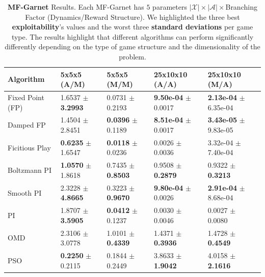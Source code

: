 \documentclass[10pt,twocolumn,letterpaper]{article}
\theoremstyle{definition}
\theoremstyle{remark}
\newcommand{\states}{\mathcal{X}}
\newcommand{\actions}{\mathcal{A}}
\begin{document}
\begin{table}[t]
\centering
\footnotesize
\begin{tabular}{lllll}
\toprule
\textbf{Algorithm} & 5x5x5 (A/M) & 5x5x5 (M/M) & 25x10x10 (A/A) & 25x10x10 (M/A) \\
\midrule
Fixed Point (FP) & 1.6537 $\pm$ \textbf{\color{salmon!75!black}3.2993} & 0.0731 $\pm$ 0.2193 & \textbf{\color{pastelblue!88!black}9.50e-04} $\pm$ 0.0017 & \textbf{\color{pastelblue!85!black}2.13e-04} $\pm$ 6.35e-04 \\
Damped FP & 1.4504 $\pm$ 2.8451 & \textbf{\color{pastelblue!88!black}0.0396} $\pm$ 0.1189 & \textbf{\color{pastelblue}8.51e-04} $\pm$ 0.0017 & \textbf{\color{pastelblue}3.43e-05} $\pm$ 9.83e-05 \\
Ficitious Play & \textbf{\color{pastelblue!88!black} 0.6235} $\pm$ 1.6547 & \textbf{\color{pastelblue}0.0118} $\pm$ 0.0236 & 0.0026 $\pm$ 0.0036 & 3.32e-04 $\pm$ 7.40e-04 \\

Boltzmann PI & \textbf{\color{pastelblue!72!black}1.0570} $\pm$ 1.8618 & 0.7435 $\pm$ \textbf{\color{salmon!88!black}0.8503} & 0.9508 $\pm$ \textbf{\color{salmon!75!black}0.2879} & 0.9322 $\pm$ \textbf{\color{salmon!75!black}0.3213} \\
Smooth PI & 2.3228 $\pm$ \textbf{\color{salmon}4.8665} & 0.3223 $\pm$ \textbf{\color{salmon}0.9670} & \textbf{\color{pastelblue!75!black}9.80e-04} $\pm$ 0.0026 & \textbf{\color{pastelblue!75!black}2.91e-04} $\pm$ 8.68e-04 \\
PI & 1.8707 $\pm$ \textbf{\color{salmon!88!black}3.5905} & \textbf{\color{pastelblue!75!black}0.0412} $\pm$ 0.1237 & 0.0030 $\pm$ 0.0046 & 0.0027 $\pm$ 0.0080 \\
OMD & 2.3106 $\pm$ 3.0778 & 1.0101 $\pm$ \textbf{\color{salmon!75!black}0.4339} & 1.4371 $\pm$ \textbf{\color{salmon!88!black}0.3936} & 1.4728 $\pm$ \textbf{\color{salmon!88!black}0.4549} \\
PSO & \textbf{\color{pastelblue}0.2250} $\pm$ 0.2115 & 0.1844 $\pm$ 0.2449 & 3.8633 $\pm$ \textbf{\color{salmon}1.9042} &  4.0158 $\pm$ \textbf{\color{salmon}2.1616} \\
\bottomrule
\end{tabular}
\caption{\textbf{MF-Garnet} Results. Each MF-Garnet has $5$ parameters $|\states|\times|\actions|\times$Branching Factor (Dynamics/Reward Structure). We highlighted the three best \textbf{\color{pastelblue} exploitability}'s values and the worst three \textbf{\color{salmon} standard deviations} per game type. The results highlight that different algorithms can perform significantly differently depending on the type of game structure and the dimensionality of the problem.}
\label{tab:garnet-results}
\end{table}
\end{document}
